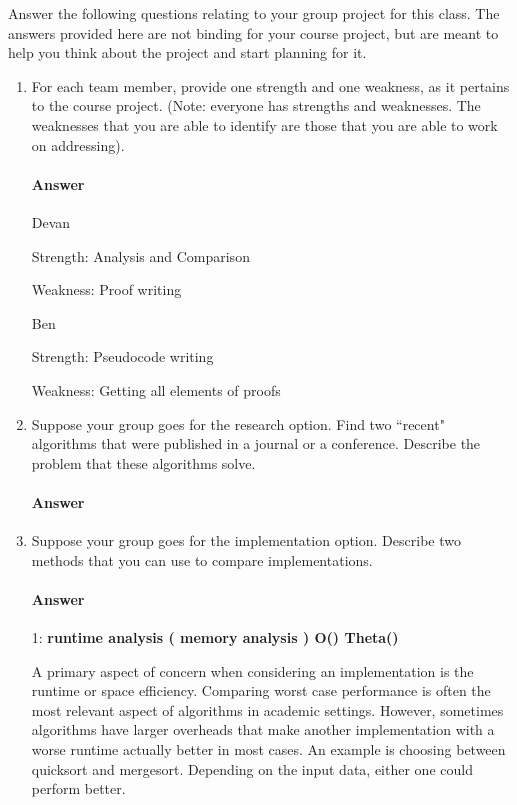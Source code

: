 \documentclass{article}
\begin{document}
Answer the following questions relating to your group project for this class.
The answers provided here are not binding for your course project, but are meant
to help you think about the project and start planning for it.

\begin{enumerate}

    \item For each team member, provide one strength and one weakness, as it
        pertains to the course project.  (Note: everyone has strengths and
        weaknesses.  The weaknesses that you are able to identify are those that
        you are able to work on addressing).

        \paragraph{Answer}

Devan

    Strength: Analysis and Comparison

    Weakness: Proof writing

Ben

    Strength: Pseudocode writing

    Weakness: Getting all elements of proofs

    \item Suppose your group goes for the research option.  Find two ``recent"
        algorithms that were published in a journal or a conference.  Describe
        the problem that these algorithms solve.

        \paragraph{Answer}
        \todo{}

    \item Suppose your group goes for the implementation option. Describe two
        methods that you can use to compare implementations.

        \paragraph{Answer}
    1: {\bf runtime analysis ( memory analysis ) O() Theta()}

A primary aspect of concern when considering an implementation is the runtime or space efficiency. Comparing worst case performance is often the most relevant aspect of algorithms in academic settings. However, sometimes algorithms have larger overheads that make another implementation with a worse runtime actually better in most cases. An example is choosing between quicksort and mergesort. Depending on the input data, either one could perform better.


\end{enumerate}
\end{document}
